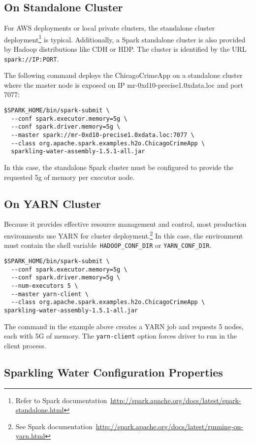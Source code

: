 \subsection{On Standalone Cluster}
For AWS deployments or local private clusters, the standalone cluster deployment\footnote{Refer to Spark documentation~\url{http://spark.apache.org/docs/latest/spark-standalone.html}} is typical. Additionally, a Spark standalone cluster is also provided by Hadoop distributions like CDH or HDP. The cluster is identified by the URL \texttt{spark://IP:PORT}.

The following command deploys the ChicagoCrimeApp on a standalone cluster where the master node is exposed on IP mr-0xd10-precise1.0xdata.loc and port 7077:

\begin{lstlisting}[style=Bash]
$SPARK_HOME/bin/spark-submit \ 
  --conf spark.executor.memory=5g \
  --conf spark.driver.memory=5g \
  --master spark://mr-0xd10-precise1.0xdata.loc:7077 \
  --class org.apache.spark.examples.h2o.ChicagoCrimeApp \
  sparkling-water-assembly-1.5.1-all.jar  
\end{lstlisting}

In this case, the standalone Spark cluster must be configured to provide the requested 5g of memory per executor node. 

\subsection{On YARN Cluster}
Because it provides effective resource management and control, most production environments use YARN for cluster deployment.\footnote{See Spark documentation~\url{http://spark.apache.org/docs/latest/running-on-yarn.html}} 
In this case, the environment must contain the shell variable~\texttt{HADOOP\_CONF\_DIR} or \texttt{YARN\_CONF\_DIR}.

\begin{lstlisting}[style=Bash]
$SPARK_HOME/bin/spark-submit \ 
  --conf spark.executor.memory=5g \
  --conf spark.driver.memory=5g \
  --num-executors 5 \
  --master yarn-client \
  --class org.apache.spark.examples.h2o.ChicagoCrimeApp \
sparkling-water-assembly-1.5.1-all.jar  
\end{lstlisting}

The command in the example above creates a YARN job and requests 5 nodes, each with 5G of memory. The \texttt{yarn-client} option forces driver to run in the client process.

\subsection{Sparkling Water Configuration Properties}

